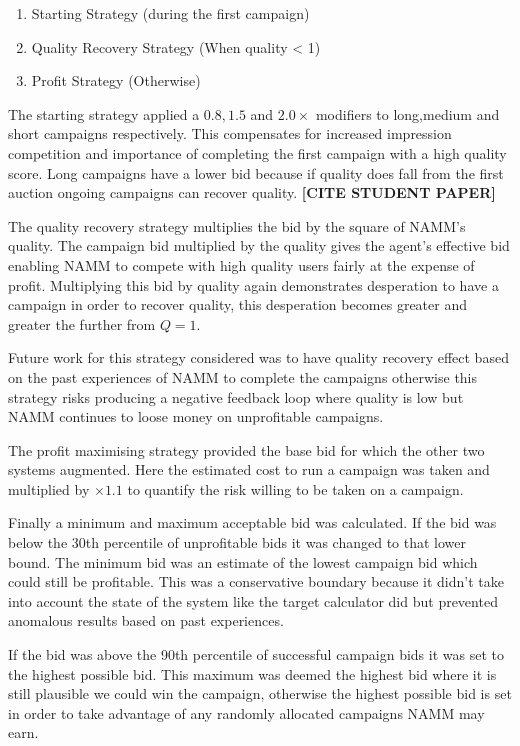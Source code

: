 \documentclass{sig-alternate-05-2015}
\begin{document}
\begin{enumerate}
\item Starting Strategy (during the first campaign)
\item Quality Recovery Strategy (When quality < 1)
\item Profit Strategy (Otherwise)
\end{enumerate}

The starting strategy applied a $0.8,1.5$ and $2.0\times$ modifiers to long,medium and short campaigns respectively. This compensates for increased impression competition and importance of completing the first campaign with a high quality score. Long campaigns have a lower bid because if quality does fall from the first auction ongoing campaigns can recover quality. \textbf{[CITE STUDENT PAPER]}

The quality recovery strategy multiplies the bid by the square of NAMM's quality. The campaign bid multiplied by the quality gives the agent's effective bid enabling NAMM to compete with high quality users fairly at the expense of profit. Multiplying this bid by quality again demonstrates desperation to have a campaign in order to recover quality, this desperation becomes greater and greater the further from $Q=1$. 

Future work for this strategy considered was to have quality recovery effect based on the past experiences of NAMM to complete the campaigns otherwise this strategy risks producing a negative feedback loop where quality is low  but NAMM continues to loose money on unprofitable campaigns. 

The profit maximising strategy provided the base bid for which the other two systems augmented. Here the estimated cost to run a campaign was taken and multiplied by $\times 1.1$ to quantify the risk willing to be taken on a campaign.

Finally a minimum and maximum acceptable bid was calculated. If the bid was below the 30th percentile of unprofitable bids it was changed to that lower bound. The minimum bid was an estimate of the lowest campaign bid which could still be profitable. This was a conservative boundary because it didn't take into account the state of the system like the target calculator did but prevented anomalous results based on past experiences. 

If the bid was above the 90th percentile of successful campaign bids it was set to the highest possible bid. This maximum was deemed the highest bid where it is still plausible we could win the campaign, otherwise the highest possible bid is set in order to take advantage of any randomly allocated campaigns NAMM may earn. 
 
\end{document}
